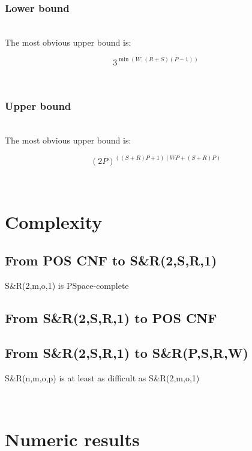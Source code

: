 \documentclass[conference]{IEEEtran}
\newcommand{\sr}{S\&{}R}
\begin{document}
\subsubsection{Lower bound}
\ \\The most obvious upper bound is:

$$3^{\min(W,(R+S)(P-1))}$$

\ \\

\subsubsection{Upper bound}
\ \\The most obvious upper bound is:

$$(2P)^{((S+R)P+1)(WP+(S+R)P)}$$

\ \\

\section{Complexity}

\subsection{From POS CNF to \sr(2,S,R,1)}
\sr(2,m,o,1) is PSpace-complete \newline

\subsection{From \sr(2,S,R,1) to POS CNF}

\subsection{From \sr(2,S,R,1) to \sr(P,S,R,W)}
\sr(n,m,o,p) is at least as difficult as \sr(2,m,o,1) \newline

\ \\

\section{Numeric results}
\end{document}
